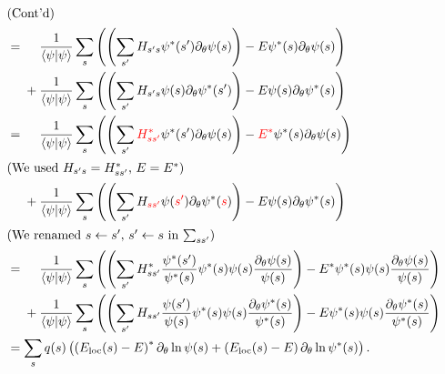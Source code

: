 \begin{align}
\intertext{(Cont'd)}
&= \phantom{{}+{}}\frac{1}{\ip{\psi}} \sum_s \left( \left( \sum_{s'} H_{s' s} \psi^*(s') \pp_\theta \psi(s) \right) - E \psi^*(s) \pp_\theta \psi(s) \right) \nonumber \\
&\phantom{{}={}}+ \frac{1}{\ip{\psi}} \sum_s \left( \left( \sum_{s'} H_{s' s} \psi(s) \pp_\theta \psi^*(s') \right) - E \psi(s) \pp_\theta \psi^*(s) \right) \\
&= \phantom{{}+{}}\frac{1}{\ip{\psi}} \sum_s \left( \left( \sum_{s'} {\color{red} H^*_{s s'}} \psi^*(s') \pp_\theta \psi(s) \right) - {\color{red} E^*} \psi^*(s) \pp_\theta \psi(s) \right) \nonumber \\
\intertext{(We used $H_{s' s} = H^*_{s s'}$, $E = E^*$)}
&\phantom{{}={}}+ \frac{1}{\ip{\psi}} \sum_s \left( \left( \sum_{s'} H_{\color{red} s s'} \psi({\color{red} s'}) \pp_\theta \psi^*({\color{red} s}) \right) - E \psi(s) \pp_\theta \psi^*(s) \right) \\
\intertext{(We renamed $s \gets s'$, $s' \gets s$ in $\sum_{s s'}$)}
%
&= \phantom{{}+{}}\frac{1}{\ip{\psi}} \sum_s \left( \left( \sum_{s'} H_{s s'}^* \frac{\psi^*(s')}{\psi^*(s)} \psi^*(s) \psi(s) \frac{\pp_\theta \psi(s)}{\psi(s)} \right) - E^* \psi^*(s) \psi(s) \frac{\pp_\theta \psi(s)}{\psi(s)} \right) \nonumber \\
&\phantom{{}={}}+ \frac{1}{\ip{\psi}} \sum_s \left( \left( \sum_{s'} H_{s s'} \frac{\psi(s')}{\psi(s)} \psi^*(s) \psi(s) \frac{\pp_\theta \psi^*(s)}{\psi^*(s)} \right) - E \psi^*(s) \psi(s) \frac{\pp_\theta \psi^*(s)}{\psi^*(s)} \right) \\
&= \sum_s q(s) \left( \left( E_\text{loc}(s) - E \right)^* \pp_\theta \ln \psi(s) + \left( E_\text{loc}(s) - E \right) \pp_\theta \ln \psi^*(s) \right).
\end{align}
